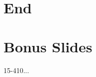 \documentclass[xcolor=dvipsnames]{beamer}
\begin{document}

\section{End}



\section{Bonus Slides}


\begin{frame}{15-410...}
\end{frame}
\end{document}
